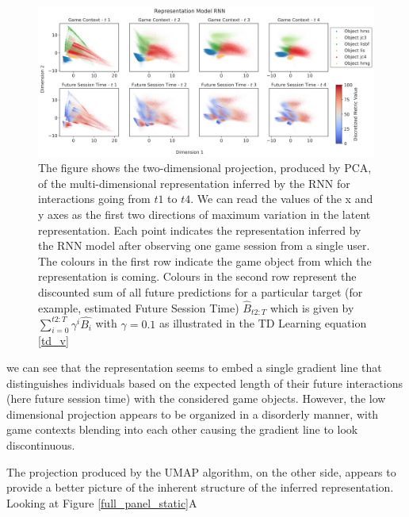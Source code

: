 \begin{figure}[!htb]
\centering
\includegraphics[width=\textwidth]{images/chapter_4/rnn_future_sess_pca.png}
\caption[\textbf{Lower dimensional representation of the latent state generated by the RNN architecture using PCA}]{The figure shows the two-dimensional projection, produced by PCA, of the multi-dimensional representation inferred by the RNN for interactions going from $t1$ to $t4$. We can read the values of the x and y axes as the first two directions of maximum variation in the latent representation. Each point indicates the representation inferred by the RNN model after observing one game session from a single user. The colours in the first row indicate the game object from which the representation is coming. Colours in the second row represent the discounted sum of all future predictions for a particular target (for example, estimated Future Session Time) $\widehat{B}_{t2:T}$ which is given by $\sum_{i=0}^{t2:T} \gamma^i\widehat{B_i}$ with $\gamma=0.1$ as illustrated in the TD Learning equation \ref{td_v}}
\label{temporal_panel_rnn_pca}
\end{figure}

we can see that the representation seems to embed a single gradient line that distinguishes individuals based on the expected length of their future interactions (here future session time) with the considered game objects. However, the low dimensional projection appears to be organized in a disorderly manner, with game contexts blending into each other causing the gradient line to look discontinuous. 

The projection produced by the UMAP algorithm, on the other side, appears to provide a better picture of the inherent structure of the inferred representation. Looking at Figure \ref{full_panel_static}A 

